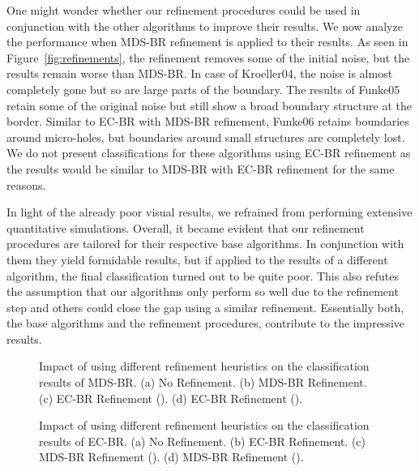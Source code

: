 \documentclass{llncs}
\begin{document}
One might wonder whether our refinement procedures could be used in conjunction with the other algorithms to improve their results.
We now analyze the performance when MDS-BR refinement is applied to their results.
As seen in Figure~\ref{fig:refinements}, the refinement removes some of the initial noise, but the results remain worse than MDS-BR.
In case of Kroeller04, the noise is almost completely gone but so are large parts of the boundary.
The results of Funke05 retain some of the original noise but still show a broad boundary structure at the border.
Similar to EC-BR with MDS-BR refinement, Funke06 retains boundaries around micro-holes, but boundaries around small structures are completely lost.
We do not present classifications for these algorithms using EC-BR refinement as the results would be similar to MDS-BR with EC-BR refinement for the same reasons.

In light of the already poor visual results, we refrained from performing extensive quantitative simulations.
Overall, it became evident that our refinement procedures are tailored for their respective base algorithms.
In conjunction with them they yield formidable results, but if applied to the results of a different algorithm, the final classification turned out to be quite poor.
This also refutes the assumption that our algorithms only perform so well due to the refinement step and others could close the gap using a similar refinement.
Essentially both, the base algorithms and the refinement procedures, contribute to the impressive results.

\begin{figure}[p]
\centering
\hfill
{}
\hfill
{}
\hfill
{}
\hfill
{}
\hfill{}
\caption{Impact of using different refinement heuristics on the classification results of MDS-BR. (a) No Refinement. (b) MDS-BR Refinement. (c) EC-BR Refinement (). (d) EC-BR Refinement ().}
\label{fig:refinement_mdsbr}
\end{figure}

\begin{figure}[p]
\centering
\hfill
{}
\hfill
{}
\hfill
{}
\hfill
{}
\hfill{}
\caption{Impact of using different refinement heuristics on the classification results of EC-BR. (a) No Refinement. (b) EC-BR Refinement. (c) MDS-BR Refinement (). (d) MDS-BR Refinement ().}
\label{fig:refinement_ecbr}
\end{figure}
\end{document}
